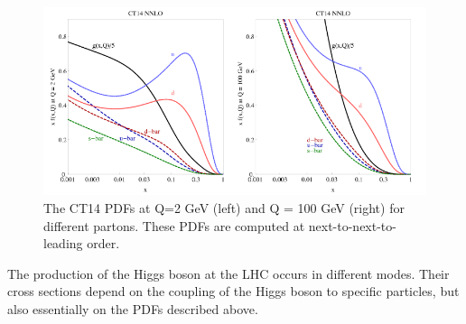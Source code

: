 \begin{figure}[htbp]
    \centering
    \includegraphics[width=\textwidth]{Ch1/Img/PDFs.png}
    \caption{The CT14 PDFs at Q=2 GeV (left) and Q = 100 GeV (right) for different partons. These PDFs are computed at next-to-next-to-leading order.}
    \label{fig:chap1:H2012:PDF}
\end{figure}

The production of the Higgs boson at the LHC occurs in different modes. Their cross sections depend on the coupling of the Higgs boson to specific particles, but also essentially on the PDFs described above.
